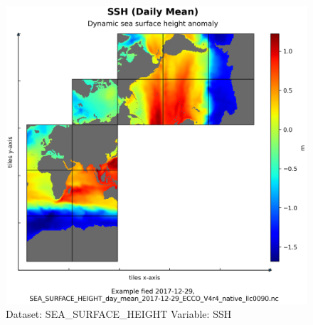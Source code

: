 \begin{figure}[H]
\centering
\includegraphics[scale=0.55]{../images/plots/native_plots/Sea_Surface_Height/SSH.png}
\caption{Dataset: SEA\_SURFACE\_HEIGHT Variable: SSH}
\label{tab:table-SEA_SURFACE_HEIGHT_SSH-Plot}
\end{figure}
\pagebreak
